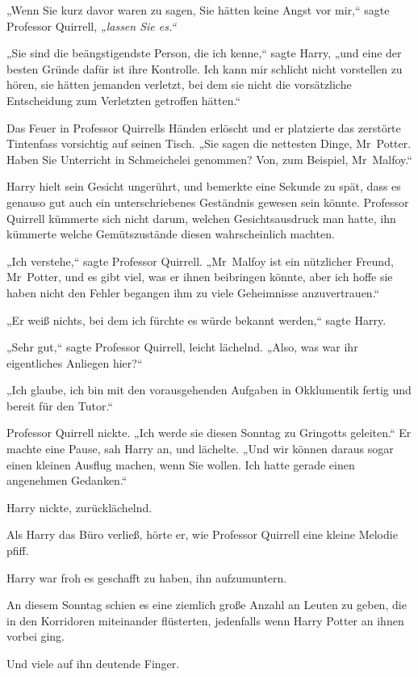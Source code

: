 {„Wenn Sie kurz davor waren zu sagen, Sie hätten keine Angst vor mir,“ sagte Professor Quirrell, \emph{„lassen Sie es.“}

„Sie sind die beängstigendste Person, die ich kenne,“ sagte Harry, „und eine der besten Gründe dafür ist ihre Kontrolle. Ich kann mir schlicht nicht vorstellen zu hören, sie hätten jemanden verletzt, bei dem sie nicht die vorsätzliche Entscheidung zum Verletzten getroffen hätten.“

Das Feuer in Professor Quirrells Händen erlöscht und er platzierte das zerstörte Tintenfass vorsichtig auf seinen Tisch. „Sie sagen die nettesten Dinge, Mr~Potter. Haben Sie Unterricht in Schmeichelei genommen? Von, zum Beispiel, Mr~Malfoy.“

Harry hielt sein Gesicht ungerührt, und bemerkte eine Sekunde zu spät, dass es genauso gut auch ein unterschriebenes Geständnis gewesen sein könnte. Professor Quirrell kümmerte sich nicht darum, welchen Gesichtsausdruck man hatte, ihn kümmerte welche Gemütszustände diesen wahrscheinlich machten.

„Ich verstehe,“ sagte Professor Quirrell. „Mr~Malfoy ist ein nützlicher Freund, Mr~Potter, und es gibt viel, was er ihnen beibringen könnte, aber ich hoffe sie haben nicht den Fehler begangen ihm zu viele Geheimnisse anzuvertrauen.“

„Er weiß nichts, bei dem ich fürchte es würde bekannt werden,“ sagte Harry.

„Sehr gut,“ sagte Professor Quirrell, leicht lächelnd. „Also, was war ihr eigentliches Anliegen hier?“

„Ich glaube, ich bin mit den vorausgehenden Aufgaben in Okklumentik fertig und bereit für den Tutor.“

Professor Quirrell nickte. „Ich werde sie diesen Sonntag zu Gringotts geleiten.“ Er machte eine Pause, sah Harry an, und lächelte. „Und wir können daraus sogar einen kleinen Ausflug machen, wenn Sie wollen. Ich hatte gerade einen angenehmen Gedanken.“

Harry nickte, zurücklächelnd.

Als Harry das Büro verließ, hörte er, wie Professor Quirrell eine kleine Melodie pfiff.

Harry war froh es geschafft zu haben, ihn aufzumuntern.

An diesem Sonntag schien es eine ziemlich große Anzahl an Leuten zu geben, die in den Korridoren miteinander flüsterten, jedenfalls wenn Harry Potter an ihnen vorbei ging.

Und viele auf ihn deutende Finger.

}
